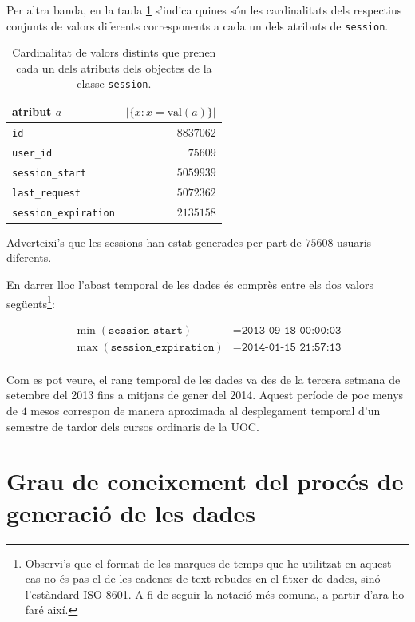 \documentclass[
	a4paper,
	twoside,
	justified
]{tufte-book}
\begin{document}
Per altra banda, en la taula \ref{tab:vals_cardinality} s'indica quines són les cardinalitats dels respectius conjunts de valors diferents corresponents a cada un dels atributs de \texttt{session}. 

\begin{table}
\label{tab:vals_cardinality}
\begin{center}
\begin{tabular}{lr}
\toprule
atribut $a$ & $\left|\{x : x = \text{val}(a) \}\right|$ \\
\midrule
\texttt{id} & $8837062$ \\
\texttt{user\_id} & $75609$ \\
\texttt{session\_start} & $5059939$ \\
\texttt{last\_request} & $5072362$ \\
\texttt{session\_expiration} & $2135158$ \\
\bottomrule
\end{tabular}
\end{center}
\caption{
	Cardinalitat de valors distints que prenen cada un dels atributs dels objectes de la classe \texttt{session}.
}
\end{table}

Adverteixi's que les sessions han estat generades per part de $75608$ usuaris diferents.

En darrer lloc l'abast temporal de les dades és comprès entre els dos valors següents\footnote{Observi's que el format de les marques de temps que he utilitzat en aquest cas  no és pas el de les cadenes de text rebudes en el fitxer de dades, sinó l'estàndard ISO 8601. A fi de seguir la notació més comuna, a partir d'ara ho faré així.}:

\begin{align*}
\min(\texttt{session\_start}) &= \texttt{2013-09-18 00:00:03} \\
\max(\texttt{session\_expiration}) &= \texttt{2014-01-15 21:57:13} \\
\end{align*}

Com es pot veure, el rang temporal de les dades va des de la tercera setmana de setembre del 2013 fins a mitjans de gener del 2014. Aquest període de poc menys de $4$ mesos correspon de manera aproximada al desplegament temporal d'un semestre de tardor dels cursos ordinaris de la UOC.     
  
\section{Grau de coneixement del procés de generació de les dades}
\end{document}
